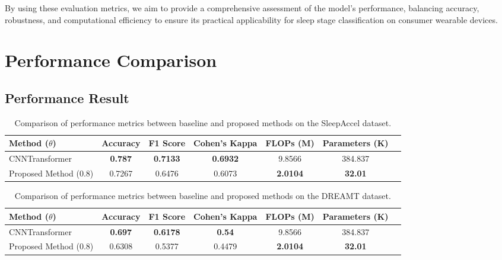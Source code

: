 By using these evaluation metrics, we aim to provide a comprehensive assessment of the model's performance, balancing accuracy, robustness, and computational efficiency to ensure its practical applicability for sleep stage classification on consumer wearable devices.

\section{Performance Comparison}

\subsection{Performance Result}

\begin{table}[ht]
    \centering
    \begin{tabular}{lcccccc}
        \toprule
        Method (\(\theta\)) & Accuracy & F1 Score & Cohen's Kappa & FLOPs (M) & Parameters (K) \\
        \midrule
        CNNTransformer & \textbf{0.787} & \textbf{0.7133} & \textbf{0.6932} & 9.8566 & 384.837  \\
        Proposed Method (0.8) & 0.7267 & 0.6476 & 0.6073 & \textbf{2.0104} & \textbf{32.01} \\
        \bottomrule
    \end{tabular}
    \caption{Comparison of performance metrics between baseline and proposed methods on the SleepAccel dataset.}
    \label{tab:performance_comparison_sleepaccel}
\end{table}

\begin{table}[ht]
    \centering
    \begin{tabular}{lcccccc}
        \toprule
        Method (\(\theta\)) & Accuracy & F1 Score & Cohen's Kappa & FLOPs (M) & Parameters (K) \\
        \midrule
        CNNTransformer & \textbf{0.697} & \textbf{0.6178} & \textbf{0.54} & 9.8566 & 384.837  \\
        Proposed Method (0.8) & 0.6308 & 0.5377 & 0.4479 & \textbf{2.0104} & \textbf{32.01} \\
        \bottomrule
    \end{tabular}
    \caption{Comparison of performance metrics between baseline and proposed methods on the DREAMT dataset.}
    \label{tab:performance_comparison_dreamt}
\end{table}

